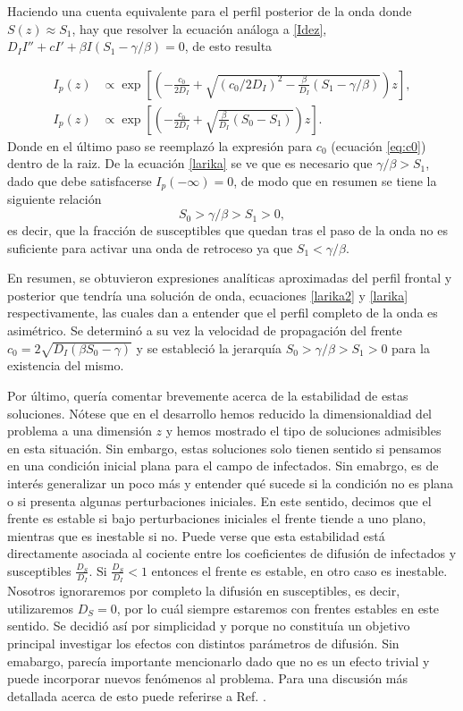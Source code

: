Haciendo una cuenta equivalente para el perfil posterior de la onda donde $S(z)\approx S_1$, hay que resolver la ecuación análoga a \ref{Idez}, 
$D_I I'' + cI'+\beta I(S_1-\gamma/\beta)=0$, de esto resulta 

\begin{align}
  I_p(z)&\propto \exp[\left(-\frac{c_0}{2D_I}+\sqrt{(c_0/2D_I)^2-\frac{\beta}{D_I}(S_1-\gamma/\beta)}\right)z], \label{larika} \\[.3cm]
  I_p(z)&\propto \exp[\left(-\frac{c_0}{2D_I}+ \sqrt{\frac{\beta}{D_I}(S_0-S_1)}\right)z].\label{larika3}
\end{align}
Donde en el último paso se reemplazó la expresión para $c_0$ (ecuación \ref{eq:c0}) dentro de la raiz. De la ecuación \ref{larika} se ve que es necesario que $\gamma/\beta>S_1$, dado que debe satisfacerse $I_p(-\infty) = 0$, de modo que en resumen se tiene la siguiente relación
\[S_0>\gamma/\beta>S_1>0,\]
es decir, que la fracción de susceptibles que quedan tras el paso de la onda no es suficiente para activar una onda de retroceso ya que $S_1<\gamma/\beta$.

En resumen, se obtuvieron expresiones analíticas aproximadas del perfil frontal y posterior que tendría una solución de onda, ecuaciones \ref{larika2} 
y \ref{larika} respectivamente, las cuales dan a entender que el perfil completo de la onda es asimétrico. Se determinó a su vez la velocidad de propagación del frente 
$c_0=2\sqrt{D_I(\beta S_0-\gamma)}$ y se estableció la jerarquía $S_0>\gamma/\beta>S_1>0$ para la existencia del mismo.

Por último, quería comentar brevemente acerca de la estabilidad de estas soluciones. Nótese que en el desarrollo hemos reducido la dimensionaldiad del problema a una dimensión $z$ y hemos mostrado el tipo de soluciones admisibles en esta situación. Sin embargo, estas soluciones solo tienen sentido si pensamos en una condición inicial plana para el campo de infectados. Sin emabrgo, es de interés generalizar un poco más y entender qué sucede si la condición no es plana o si presenta algunas perturbaciones iniciales. En este sentido, decimos que el frente es estable si bajo perturbaciones iniciales el frente tiende a uno plano, mientras que es inestable si no. Puede verse que esta estabilidad está directamente asociada al cociente entre los coeficientes de difusión de infectados y susceptibles $\frac{D_S}{D_I}$. Si $\frac{D_S}{D_I}<1$ entonces el frente es estable, en otro caso es inestable. Nosotros ignoraremos por completo la difusión en susceptibles, es decir, utilizaremos $D_S=0$, por lo cuál siempre estaremos con frentes estables en este sentido. Se decidió así por simplicidad y porque no constituía un objetivo principal investigar los efectos con distintos parámetros de difusión. Sin emabargo, parecía importante mencionarlo dado que no es un efecto trivial y puede incorporar nuevos fenómenos al problema. Para una discusión más detallada acerca de esto puede referirse a Ref. \cite{horvath1993instabilities}.

